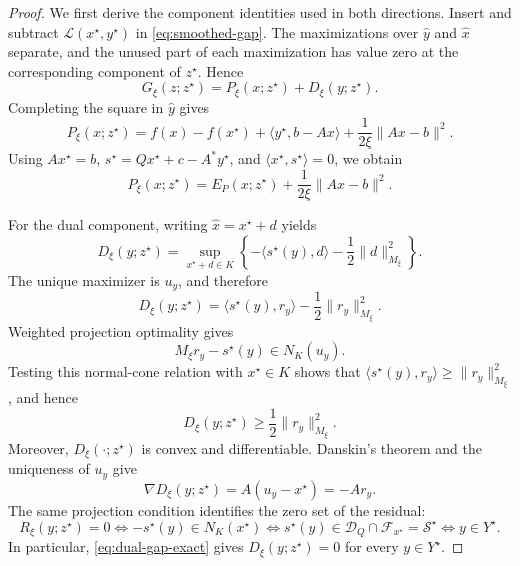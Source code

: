 \documentclass[letterpaper]{article} %
\theoremstyle{definition}
\theoremstyle{remark}
\begin{document}
\begin{proof}
We first derive the component identities used in both directions.  Insert
and subtract $\mathcal L(x^\star,y^\star)$ in
\eqref{eq:smoothed-gap}.  The maximizations over $\widehat y$ and
$\widehat x$ separate, and the unused part of each maximization has value
zero at the corresponding component of $z^\star$.  Hence
\begin{equation}
\label{eq:gap-separation}
    G_\xi(z;z^\star)
    =
    P_\xi(x;z^\star)+D_\xi(y;z^\star).
\end{equation}
Completing the square in $\widehat y$ gives
\[
    P_\xi(x;z^\star)
    =
    f(x)-f(x^\star)
    +\langle y^\star,b-Ax\rangle
    +\frac1{2\xi}\|Ax-b\|^2.
\]
Using $Ax^\star=b$, $s^\star=Qx^\star+c-A^*y^\star$, and
$\langle x^\star,s^\star\rangle=0$, we obtain
\begin{equation}
\label{eq:primal-smoothed-gap}
    P_\xi(x;z^\star)
    =
    E_P(x;z^\star)+\frac1{2\xi}\|Ax-b\|^2.
\end{equation}

For the dual component, writing $\widehat x=x^\star+d$ yields
\[
    D_\xi(y;z^\star)
    =
    \sup_{x^\star+d\in K}
    \left\{
        -\langle s^\star(y),d\rangle
        -\frac12\|d\|_{M_\xi}^2
    \right\}.
\]
The unique maximizer is $u_y$, and therefore
\begin{equation}
\label{eq:dual-gap-exact}
    D_\xi(y;z^\star)
    =
    \langle s^\star(y),r_y\rangle
    -\frac12\|r_y\|_{M_\xi}^2.
\end{equation}
Weighted projection optimality gives
\[
    M_\xi r_y-s^\star(y)\in N_K(u_y).
\]
Testing this normal-cone relation with $x^\star\in K$ shows that
$\langle s^\star(y),r_y\rangle\ge\|r_y\|_{M_\xi}^2$, and hence
\begin{equation}
\label{eq:dual-gap-lower-bound}
    D_\xi(y;z^\star)
    \ge
    \frac12\|r_y\|_{M_\xi}^2.
\end{equation}
Moreover, $D_\xi(\cdot;z^\star)$ is convex and differentiable.  Danskin's
theorem and the uniqueness of $u_y$ give
\begin{equation}
\label{eq:dual-gap-gradient}
    \nabla D_\xi(y;z^\star)
    =
    A(u_y-x^\star)
    =
    -Ar_y.
\end{equation}
The same projection condition identifies the zero set of the residual:
\[
    R_\xi(y;z^\star)=0 \Longleftrightarrow -s^\star(y)\in N_K(x^\star) \Longleftrightarrow s^\star(y)\in\mathcal D_Q\cap\mathcal F_{x^\star} =\mathcal S^\star \Longleftrightarrow y\in Y^\star.
\]
In particular, \eqref{eq:dual-gap-exact} gives
$D_\xi(y;z^\star)=0$ for every $y\in Y^\star$.


\end{proof}
\end{document}
